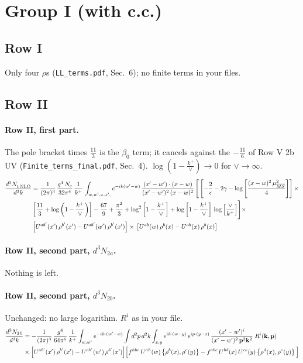 \documentclass[10pt]{article}
\numberwithin{equation}{section}
\begin{document}
\section{Group I (with c.c.)}\label{sec:FgI}
\subsection{Row I}
Only four $\rho$\textquotesingle s (\texttt{LL\_terms.pdf}, Sec.~6); no finite terms in your files.
\subsection{Row II}
\paragraph{Row II, first part.}
The pole bracket times $\frac{11}{3}$ is the $\beta_0$ term; it cancels against the $-\frac{11}{6}$ of Row V 2b UV (\texttt{Finite\_terms\_final.pdf}, Sec.~4). $\log(1-\frac{k^+}{\vee})\to0$ for $\vee\to\infty$.
\begin{align}
     \frac{d^{3}N_{1\,\rm NLO}^{\rm}}{d^{3}k} &  =  \frac{1}{(2\pi)^{3}}\, \frac{g^{4}\,N_{c}}{32\pi^{4}}\,\frac{1}{k^{+}}\, \int_{w, w',x,x',} e^{-ik(w^\prime-w)}\, \frac{(x'-w')\cdot (x-w)}{(x'-w')^{2}\, (x-w)^{2}}\, \Bigg[\left[-\frac{2}{\epsilon}-2\gamma-\log{\left[\frac{(x-w)^{2}\,\mu^{2}_{\overline{MS}}}{4}\right]}\right]\times \notag \\ & \left[\frac{11}{3}+\log{\left(1-\frac{k^{+}}{\vee}\right)}\right]-\frac{67}{9}+\frac{\pi^{2}}{3}+\log^{2}{\left[1-\frac{k^{+}}{\vee}\right]}+\log{\left[1-\frac{k^{+}}{\vee}\right]}\,\log{\left[\frac{\vee}{k^{+}}\right]}\Bigg]\times\notag \\ & \left[U^{ab'}(x')\,\rho^{b'}(x') - U^{ab'}(w')\,\rho^{b'}(x')\right]\times\,\left[U^{ab}(w)\,\rho^{b}(x) - U^{ab}(x)\,\rho^{b}(x)\right] \label{eq:F:G1II1}
\end{align}

\paragraph{Row II, second part, $d^3N_{2a}$.}
Nothing is left.
\paragraph{Row II, second part, $d^3N_{2b}$.}
Unchanged: no large logarithm. $R^i$ as in your file.
\begin{align}
\frac{d^{3}N_{2\,b}}{d^{3}k} & =  -\frac{1}{(2\pi)^{3}}\,\frac{g^{4}}{64\pi^{6}}\,\frac{1}{k^{+}}\int_{w,w'} e^{-ik\cdot(w'-w)}
\int d^{2}p\,d^{2}k\int_{x,y} e^{ik\cdot(w-y)}\,e^{ip\cdot(y-x)}\,\frac{(x'-w')^{i}}{(x'-w')^{2}\,\mathbf{p}^{2}\mathbf{k}^{2}}\;R^{i}(\mathbf{k},\mathbf{p})\notag\\
&\times\Big[U^{ab'}(x')\,\rho^{b'}(x')-U^{ab'}(w')\,\rho^{b'}(x')\Big]
\Big[f^{hbc}\,U^{ah}(w)\left\{\rho^{b}(x),\rho^{c}(y)\right\}-f^{abc}\,U^{bd}(x)\,U^{ce}(y)\left\{\rho^{d}(x),\rho^{e}(y)\right\}\Big] \label{eq:F:G1II2b}
\end{align}
\end{document}
